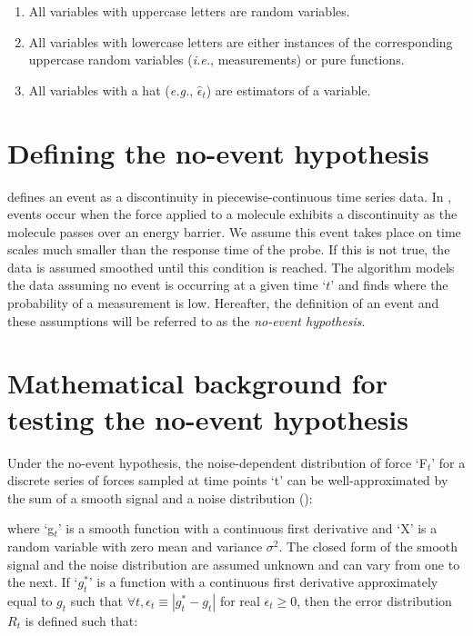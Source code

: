\begin{enumerate}
 \item All variables with uppercase letters are random variables.
 \item All variables with lowercase letters are either instances of the corresponding uppercase random variables (\textit{i.e.}, measurements) or pure functions.
 \item All variables with a hat (\textit{e.g.}, $\hat{\epsilon}_t$) are estimators of a variable.
\end{enumerate}

\section{Defining the no-event hypothesis}

\name{} defines an event as a discontinuity in piecewise-continuous time series data. In \singlemol{}, events occur when the force applied to a molecule exhibits a discontinuity as the molecule passes over an energy barrier. We assume this event takes place on time scales much smaller than the response time of the probe. If this is not true, the data is assumed smoothed until this condition is reached. The algorithm models the data assuming no event is occurring at a given time `$t$' and finds where the probability of a measurement is low. Hereafter, the definition of an event and these assumptions will be referred to as the \emph{no-event hypothesis}. 

\section{Mathematical background for testing the no-event hypothesis}

Under the no-event hypothesis, the noise-dependent distribution of force `F$_t$' for a discrete series of forces sampled at time points `t' can be well-approximated by the sum of a smooth signal and a noise distribution ():


where `g$_t$' is a smooth function with a continuous first derivative and `X' is a random variable with zero mean and variance $\sigma^2$. The closed form of the smooth signal and the noise distribution are assumed unknown and can vary from one \fec{} to the next. If `$g^{*}_t$' is a function with a continuous first derivative approximately equal to $g_t$ such that $\forall t,\epsilon_t\equiv|g^{*}_t-g_t|$ for real $\epsilon_t\ge 0$, then the error distribution $R_t$ is defined such that: 


